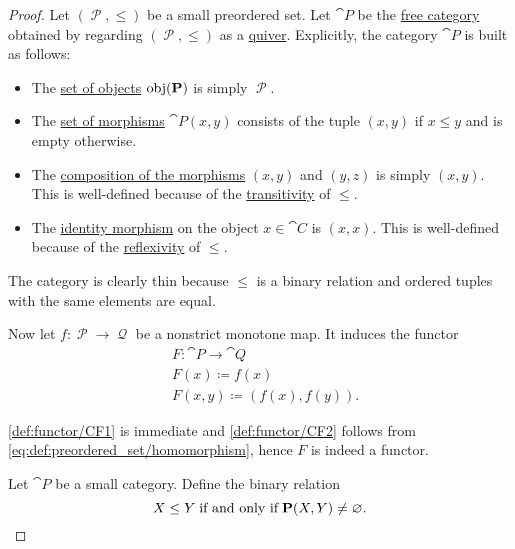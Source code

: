 \begin{proof}
   Let \( (\mscrP, \leq) \) be a small preordered set. Let \( \cat{P} \) be the \hyperref[def:quiver_free_category]{free category} obtained by regarding \( (\mscrP, \leq) \) as a \hyperref[def:quiver]{quiver}. Explicitly, the category \( \cat{P} \) is built as follows:
  \begin{itemize}
    \item The \hyperref[def:category/objects]{set of objects} \( \operatorname{obj}(\operatorname{\mathbf{P}}) \) is simply \( \mscrP \).

    \item The \hyperref[def:category/morphisms]{set of morphisms} \( \cat{P}(x, y) \) consists of the tuple \( (x, y) \) if \( x \leq y \) and is empty otherwise.

    \item The \hyperref[def:category/composition]{composition of the morphisms} \( (x, y) \) and \( (y, z) \) is simply \( (x, y) \). This is well-defined because of the \hyperref[def:binary_relation/transitive]{transitivity} of \( \leq \).

    \item The \hyperref[def:category/identity]{identity morphism} on the object \( x \in \cat{C} \) is \( (x, x) \). This is well-defined because of the \hyperref[def:binary_relation/reflexive]{reflexivity} of \( \leq \).
  \end{itemize}

  The category is clearly thin because \( \leq \) is a binary relation and ordered tuples with the same elements are equal.

  Now let \( f: \mscrP \to \mscrQ \) be a nonstrict monotone map. It induces the functor
  \begin{equation*}
    \begin{aligned}
      &F: \cat{P} \to \cat{Q} \\
      &F(x) \coloneqq f(x) \\
      &F(x, y) \coloneqq (f(x), f(y)).
    \end{aligned}
  \end{equation*}

  \ref{def:functor/CF1} is immediate and \ref{def:functor/CF2} follows from \eqref{eq:def:preordered_set/homomorphism}, hence \( F \) is indeed a functor.

   Let \( \cat{P} \) be a small category. Define the binary relation
  \begin{equation*}
    X \leq Y \T{if and only if} \cat{P}(X, Y) \neq \varnothing.
  \end{equation*}


\end{proof}
